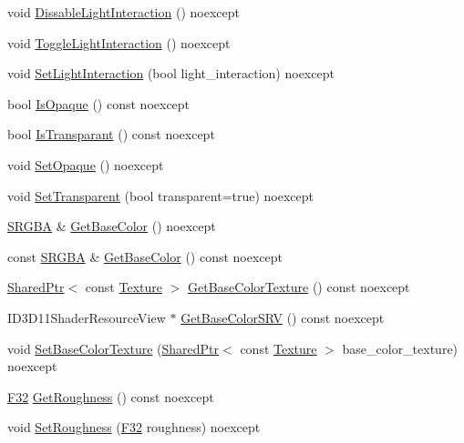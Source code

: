\begin{DoxyCompactItemize}
void \hyperlink{classmage_1_1_material_ab4b92a53ee74e401c518eea299fb4e0b}{Dissable\+Light\+Interaction} () noexcept
\item 
void \hyperlink{classmage_1_1_material_a9c8c15d426461b4a597b9a9947a7bd62}{Toggle\+Light\+Interaction} () noexcept
\item 
void \hyperlink{classmage_1_1_material_a9b0bcb448cf9c96bcb63dcbc0f110bd1}{Set\+Light\+Interaction} (bool light\+\_\+interaction) noexcept
\item 
bool \hyperlink{classmage_1_1_material_a0df1804c29bfd9d2bbc606d6285dccec}{Is\+Opaque} () const noexcept
\item 
bool \hyperlink{classmage_1_1_material_a6a62e3889887e77259070e1f9cd9150f}{Is\+Transparant} () const noexcept
\item 
void \hyperlink{classmage_1_1_material_ab3c49ab54603adebb1d08803fc700fc9}{Set\+Opaque} () noexcept
\item 
void \hyperlink{classmage_1_1_material_abf7e618017185ea05c72d050e89018fe}{Set\+Transparent} (bool transparent=true) noexcept
\item 
\hyperlink{structmage_1_1_s_r_g_b_a}{S\+R\+G\+BA} \& \hyperlink{classmage_1_1_material_a8c6c6e3bb527b98320446206306c6979}{Get\+Base\+Color} () noexcept
\item 
const \hyperlink{structmage_1_1_s_r_g_b_a}{S\+R\+G\+BA} \& \hyperlink{classmage_1_1_material_abadf5557a1047cb7c371c715e99876a3}{Get\+Base\+Color} () const noexcept
\item 
\hyperlink{namespacemage_a1e01ae66713838a7a67d30e44c67703e}{Shared\+Ptr}$<$ const \hyperlink{classmage_1_1_texture}{Texture} $>$ \hyperlink{classmage_1_1_material_a76b84c808a281589d60ebbe2e2932c01}{Get\+Base\+Color\+Texture} () const noexcept
\item 
I\+D3\+D11\+Shader\+Resource\+View $\ast$ \hyperlink{classmage_1_1_material_aef6ae5f87347d9e4bf798079aa906dd3}{Get\+Base\+Color\+S\+RV} () const noexcept
\item 
void \hyperlink{classmage_1_1_material_a85f9544a9d26f252a27a3bc6c271456a}{Set\+Base\+Color\+Texture} (\hyperlink{namespacemage_a1e01ae66713838a7a67d30e44c67703e}{Shared\+Ptr}$<$ const \hyperlink{classmage_1_1_texture}{Texture} $>$ base\+\_\+color\+\_\+texture) noexcept
\item 
\hyperlink{namespacemage_aa97e833b45f06d60a0a9c4fc22ae02c0}{F32} \hyperlink{classmage_1_1_material_a5b1a4e965f812e18594cf7455d49139c}{Get\+Roughness} () const noexcept
\item 
void \hyperlink{classmage_1_1_material_ad1df4026da1b5abc3924c7ce09a81a02}{Set\+Roughness} (\hyperlink{namespacemage_aa97e833b45f06d60a0a9c4fc22ae02c0}{F32} roughness) noexcept

\end{DoxyCompactItemize}
